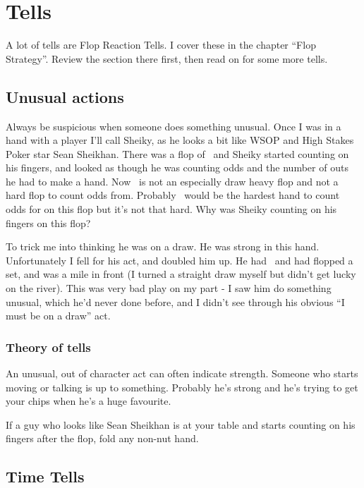\chapter{Tells}


A lot of tells are Flop Reaction Tells. I cover these in
the chapter ``Flop Strategy''. Review the section there first, then
read on for some more tells.

\section{Unusual actions}

Always be suspicious when someone does something unusual.
Once I was in a hand with a player I'll call Sheiky, as
he looks a bit like WSOP and High Stakes Poker star Sean Sheikhan.
There was a flop of \Kc\nined\sevd\, and Sheiky started counting on his
fingers, and looked as though he was counting odds and the number
of outs he had to make a hand. Now \Kc\nined\sevd\ is not an especially
draw heavy flop and not a hard flop to count odds from. Probably \Qd\tens\ would
be the hardest hand to count odds for on this flop but it's not
that hard. Why was Sheiky counting on his fingers on this flop?

To trick me into thinking he was on a draw. He was strong in
this hand. Unfortunately I fell for his act, and doubled him up.
He had \ninec\nineh\, and had flopped a set, and was a mile in front (I turned
a straight draw myself but didn't get lucky on the river). This
was very bad play on my part - I saw him do something unusual, which
he'd never done before, and I didn't see through his obvious
``I must be on a draw'' act.

\subsection{Theory of tells} 

An unusual, out of character act can often indicate
strength. Someone who starts moving or talking is up to something.
Probably he's strong and he's trying to get your chips when he's
a huge favourite. 

If a guy who looks like Sean Sheikhan is at
your table and starts counting on his fingers after the flop, fold any 
non-nut hand.

\section{Time Tells}

